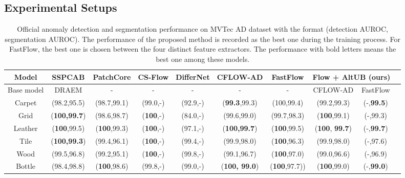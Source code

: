 \documentclass[letterpaper]{article}
\begin{document}
\subsection{Experimental Setups}
\begin{table*}[t] 
\caption{Official anomaly detection and segmentation performance on MVTec AD dataset with the format (detection AUROC, segmentation AUROC). The performance of the proposed method is recorded as the best one during the training process. For FastFlow, the best one is chosen between the four distinct feature extractors. The performance with bold letters means the best one among these models.}
\label{table-altub-best}
\centering
\begin{tabular}{c|c|c|c|c|c|c|c|cc}
\hline
Model      & SSPCAB      & PatchCore   & CS-Flow  & DifferNet & CFLOW-AD      & FastFlow     & \multicolumn{2}{c}{Flow + AltUB (ours)}                                  \\ \hline
Base model & DRAEM       & -           & -        & -         & -           & -            & \multicolumn{1}{c|}{CFLOW-AD}       & \multicolumn{1}{c}{FastFlow} \\ \hline
Carpet     & (98.2,95.5) & (98.7,99.1) & (99.0,-) & (92.9,-)  & (\textbf{99.3},99.3) & (100,99.4)         & \multicolumn{1}{c|}{(99.2,99.3)} & \multicolumn{1}{c}{(-,\textbf{99.5})} \\
Grid       & (\textbf{100,99.7})  & (98.6,98.7) & (\textbf{100},-)  & (84.0,-)  & (99.6,99.0) & (99.7,98.3)          & \multicolumn{1}{c|}{(\textbf{100},99.1)}  & \multicolumn{1}{c}{(-,99.3)} \\
Leather    & (\textbf{100},99.5)  & (\textbf{100},99.3)  & (\textbf{100},-)  & (97.1,-)  & (\textbf{100,99.7})  & (\textbf{100},99.5)       & \multicolumn{1}{c|}{(\textbf{100}, \textbf{99.7})}  & \multicolumn{1}{c}{(-,\textbf{99.7})} \\
Tile       & (\textbf{100,99.3})  & (99.4,96.1) & (\textbf{100},-)  & (99.4,-)  & (99.9,98.0) & (\textbf{100},96.3)          & \multicolumn{1}{c|}{(99.9,98.0)} & \multicolumn{1}{c}{(-,97.6)} \\
Wood       & (99.5,96.8) & (99.2,95.1) & (\textbf{100},-)  & (99.8,-)  & (99.1,96.7) & (\textbf{100},97.0)      & \multicolumn{1}{c|}{(99.0,96.6)} & \multicolumn{1}{c}{(-,96.9)} \\
Bottle     & (98.4,98.8) & (\textbf{100},98.6)  & (99.8,-) & (99.0,-)  & (\textbf{100, 99.0}) & (\textbf{100},97.7))    & \multicolumn{1}{c|}{(\textbf{100},99.0)}  & \multicolumn{1}{c}{(-,\textbf{99.0})} \\

\end{tabular}
\end{table*}
\end{document}
